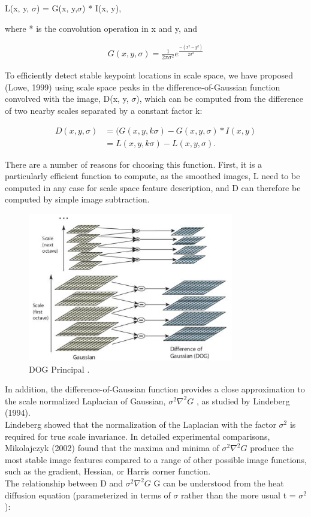 L(x, y, $\sigma$) = G(x, y,$\sigma$) * I(x, y),


where * is the convolution operation in x and y, and

\begin{align*} 
 G(x, y,\sigma )  =\frac{1}{2\pi\sigma^2} e^\frac{-( x^2 -  y^2)}{2\sigma^2}  
\end{align*}

To efficiently detect stable keypoint locations in scale space, we have proposed (Lowe,
1999) using scale space peaks in the difference-of-Gaussian function convolved with the
image, D(x, y, $\sigma$), which can be computed from the difference of two nearby scales separated
by a constant factor k:


\begin{align}
D(x, y, \sigma) &= (G(x, y, k\sigma) - G(x, y,\sigma) * I(x, y)\\
                 &= L(x, y, k\sigma) - L(x, y, \sigma) .
   \end{align}               
                  
There are a number of reasons for choosing this function. First, it is a particularly
efficient function to compute, as the smoothed images, L  need to be computed in any
case for scale space feature description, and D can therefore be computed by simple image
subtraction.

\begin{figure}[H]
\centering
\includegraphics[width=0.8\textwidth]{img/sift_dog.jpg}
\caption{ DOG Principal .}
\label{fig:sift1}
\end{figure}

In addition, the difference-of-Gaussian function provides a close approximation to the
scale normalized Laplacian of Gaussian, $\sigma^2\nabla^2 G $
, as studied by Lindeberg (1994).\\Lindeberg
showed that the normalization of the Laplacian with the factor $\sigma^2$
is required for true scale invariance. In detailed experimental comparisons, Mikolajczyk (2002) found that the maxima and minima of $\sigma^2\nabla^2 G $  produce the most stable image features compared to a range
of other possible image functions, such as the gradient, Hessian, or Harris corner function.\\
The relationship between D and $\sigma^2\nabla^2G $
G can be understood from the heat diffusion
equation (parameterized in terms of $\sigma$ rather than the more usual t = $\sigma^2$):\\

